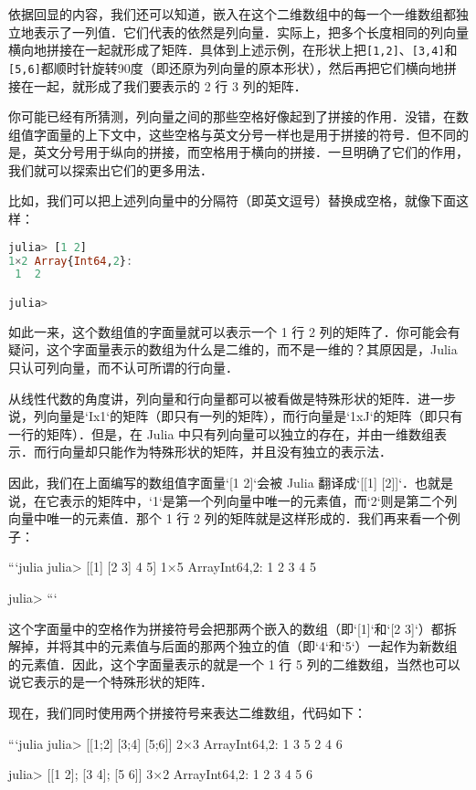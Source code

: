 依据回显的内容，我们还可以知道，嵌入在这个二维数组中的每一个一维数组都独立地表示了一列值．它们代表的依然是列向量．实际上，把多个长度相同的列向量横向地拼接在一起就形成了矩阵．具体到上述示例，在形状上把\verb|[1,2]|、\verb|[3,4]|和\verb|[5,6]|都顺时针旋转90度（即还原为列向量的原本形状），然后再把它们横向地拼接在一起，就形成了我们要表示的 2 行 3 列的矩阵．

你可能已经有所猜测，列向量之间的那些空格好像起到了拼接的作用．没错，在数组值字面量的上下文中，这些空格与英文分号一样也是用于拼接的符号．但不同的是，英文分号用于纵向的拼接，而空格用于横向的拼接．一旦明确了它们的作用，我们就可以探索出它们的更多用法．

比如，我们可以把上述列向量中的分隔符（即英文逗号）替换成空格，就像下面这样：

\begin{lstlisting}[language=julia]
julia> [1 2]
1×2 Array{Int64,2}:
 1  2

julia> 
\end{lstlisting}

如此一来，这个数组值的字面量就可以表示一个 1 行 2 列的矩阵了．你可能会有疑问，这个字面量表示的数组为什么是二维的，而不是一维的？其原因是，Julia 只认可列向量，而不认可所谓的行向量．

从线性代数的角度讲，列向量和行向量都可以被看做是特殊形状的矩阵．进一步说，列向量是`Ix1`的矩阵（即只有一列的矩阵），而行向量是`1xJ`的矩阵（即只有一行的矩阵）．但是，在 Julia 中只有列向量可以独立的存在，并由一维数组表示．而行向量却只能作为特殊形状的矩阵，并且没有独立的表示法．

因此，我们在上面编写的数组值字面量`[1 2]`会被 Julia 翻译成`[[1] [2]]`．也就是说，在它表示的矩阵中，`1`是第一个列向量中唯一的元素值，而`2`则是第二个列向量中唯一的元素值．那个 1 行 2 列的矩阵就是这样形成的．我们再来看一个例子：

```julia
julia> [[1] [2 3] 4 5]
1×5 Array{Int64,2}:
 1  2  3  4  5

julia> 
```

这个字面量中的空格作为拼接符号会把那两个嵌入的数组（即`[1]`和`[2 3]`）都拆解掉，并将其中的元素值与后面的那两个独立的值（即`4`和`5`）一起作为新数组的元素值．因此，这个字面量表示的就是一个 1 行 5 列的二维数组，当然也可以说它表示的是一个特殊形状的矩阵．

现在，我们同时使用两个拼接符号来表达二维数组，代码如下：

```julia
julia> [[1;2] [3;4] [5;6]]
2×3 Array{Int64,2}:
 1  3  5
 2  4  6

julia> [[1 2]; [3 4]; [5 6]]
3×2 Array{Int64,2}:
 1  2
 3  4
 5  6

